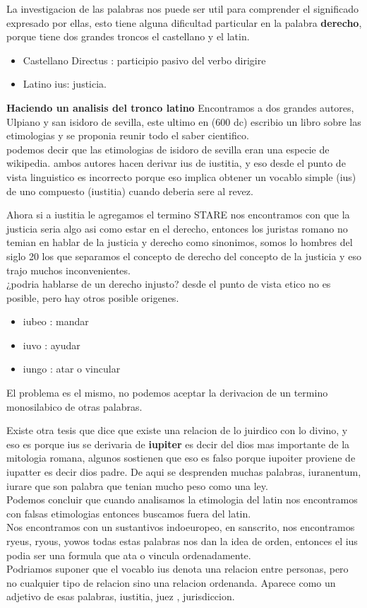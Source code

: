 \documentclass[12pt]{book}
\begin{document}
La investigacion de las palabras nos puede ser util para comprender el significado expresado por ellas, esto tiene alguna dificultad particular en la palabra \textbf{derecho}, porque tiene dos grandes troncos el castellano y el latin.
\begin{itemize}
\item Castellano Directus : participio pasivo del verbo dirigire
\item Latino ius: justicia.
\end{itemize}

\textbf{Haciendo un analisis del tronco latino}
Encontramos a dos grandes autores, Ulpiano y san isidoro de sevilla, este ultimo en (600 dc) escribio un libro sobre las etimologias y se proponia reunir todo el saber cientifico.
\\
podemos decir que las etimologias de isidoro de sevilla eran una especie de wikipedia.
ambos autores hacen derivar ius de iustitia, y eso desde el punto de vista linguistico es incorrecto porque eso implica obtener un vocablo simple (ius) de uno compuesto (iustitia) cuando deberia sere al revez.

Ahora si a iustitia le agregamos el termino STARE nos encontramos con que la justicia seria algo asi como estar en el derecho, entonces los juristas romano no temian en hablar de la justicia y derecho como sinonimos, somos lo hombres del siglo 20 los que separamos el concepto de derecho del concepto de la justicia y eso trajo muchos inconvenientes.
\\
¿podria hablarse de un derecho injusto? 
desde el punto de vista etico no es posible, pero hay otros posible origenes.
\begin{itemize}
\item iubeo : mandar
\item iuvo : ayudar
\item iungo : atar o vincular
\end{itemize}

El problema es el mismo, no podemos aceptar la derivacion de un termino monosilabico de otras palabras.

Existe otra tesis que dice que existe una relacion de lo juirdico con lo divino, y eso es porque ius se derivaria de \textbf{iupiter} es decir del dios mas importante de la mitologia romana, algunos sostienen que eso es falso porque iupoiter proviene de iupatter es decir dios padre.
De aqui se desprenden muchas palabras, iuranentum, iurare que son palabra que tenian mucho peso como una ley.
\\
Podemos concluir que cuando analisamos la etimologia del latin nos encontramos con falsas etimologias entonces buscamos fuera del latin.
\\
Nos encontramos con un sustantivos indoeuropeo, en sanscrito, nos encontramos ryeus, ryous, yowos todas estas palabras nos dan la idea de orden, entonces el ius podia ser una formula que ata o vincula ordenadamente.
\\
Podriamos suponer que el vocablo ius denota una relacion entre personas, pero no cualquier tipo de relacion sino una relacion ordenanda. 
Aparece como un adjetivo de esas palabras, iustitia, juez , jurisdiccion.
\end{document}
